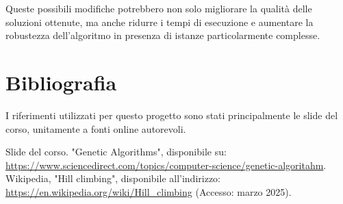 \documentclass[a4paper,12pt]{article}
\begin{document}
Queste possibili modifiche potrebbero non solo migliorare la qualità delle soluzioni ottenute, ma anche ridurre i tempi di esecuzione e aumentare la robustezza dell'algoritmo in presenza di istanze particolarmente complesse.

\newpage
\section{Bibliografia}
I riferimenti utilizzati per questo progetto sono stati principalmente le slide del corso, unitamente a fonti online autorevoli. 
\begin{thebibliography}{9}
Slide del corso.
"Genetic Algorithms", disponibile su: \url{https://www.sciencedirect.com/topics/computer-science/genetic-algoritahm}.
Wikipedia, "Hill climbing", disponibile all'indirizzo: \url{https://en.wikipedia.org/wiki/Hill_climbing} (Accesso: marzo 2025).
\end{thebibliography}
\end{document}
